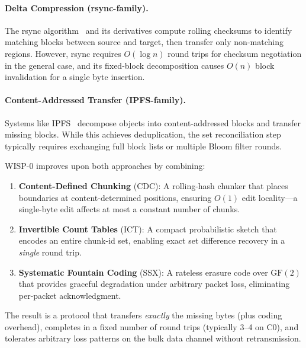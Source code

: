 \documentclass[11pt,twocolumn]{article}
\theoremstyle{definition}
\begin{document}
\paragraph{Delta Compression (rsync-family).}
The rsync algorithm~\cite{rsync} and its derivatives compute rolling
checksums to identify matching blocks between source and target, then
transfer only non-matching regions. However, rsync requires $O(\log n)$
round trips for checksum negotiation in the general case, and its
fixed-block decomposition causes $O(n)$ block invalidation for a single
byte insertion.

\paragraph{Content-Addressed Transfer (IPFS-family).}
Systems like IPFS~\cite{ipfs} decompose objects into content-addressed
blocks and transfer missing blocks. While this achieves deduplication,
the set reconciliation step typically requires exchanging full block
lists or multiple Bloom filter rounds.

\medskip

WISP-0 improves upon both approaches by combining:

\begin{enumerate}
  \item \textbf{Content-Defined Chunking} (CDC): A rolling-hash chunker
    that places boundaries at content-determined positions, ensuring
    $O(1)$ edit locality---a single-byte edit affects at most a constant
    number of chunks.

  \item \textbf{Invertible Count Tables} (ICT): A compact probabilistic
    sketch that encodes an entire chunk-id set, enabling exact set
    difference recovery in a \emph{single} round trip.

  \item \textbf{Systematic Fountain Coding} (SSX): A rateless erasure
    code over $\text{GF}(2)$ that provides graceful degradation under
    arbitrary packet loss, eliminating per-packet acknowledgment.
\end{enumerate}

The result is a protocol that transfers \emph{exactly} the missing bytes
(plus coding overhead), completes in a fixed number of round trips
(typically 3--4 on C0), and tolerates arbitrary loss patterns on the
bulk data channel without retransmission.
\end{document}
